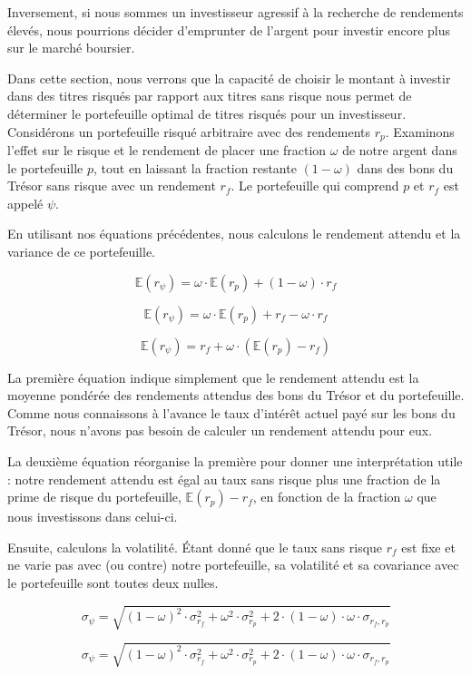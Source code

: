 \documentclass[a4paper, 12pt]{report}
\begin{document}
Inversement, si nous sommes un investisseur agressif à la recherche de rendements élevés, nous pourrions décider d'emprunter de l'argent pour investir encore plus sur le marché boursier.

Dans cette section, nous verrons que la capacité de choisir le montant à investir dans des titres risqués par rapport aux titres sans risque nous permet de déterminer le portefeuille optimal de titres risqués pour un investisseur.
Considérons un portefeuille risqué arbitraire avec des rendements \( r_p \). Examinons l'effet sur le risque et le rendement de placer une fraction \( \omega \) de notre argent dans le portefeuille \( p \), tout en laissant la fraction restante \( (1 - \omega) \) dans des bons du Trésor sans risque avec un rendement \( r_f \). Le portefeuille qui comprend \( p \) et \( r_f \) est appelé \( \psi \).

En utilisant nos équations précédentes, nous calculons le rendement attendu et la variance de ce portefeuille.

\[
\mathbb{E}(r_\psi) = \omega \cdot \mathbb{E}(r_p) + (1 - \omega) \cdot r_f 
\]

\[
\mathbb{E}(r_\psi) = \omega \cdot \mathbb{E}(r_p) + r_f - \omega \cdot r_f 
\]

\[
\mathbb{E}(r_\psi) = r_f + \omega \cdot (\mathbb{E}(r_p) - r_f) 
\]

La première équation indique simplement que le rendement attendu est la moyenne pondérée des rendements attendus des bons du Trésor et du portefeuille. Comme nous connaissons à l'avance le taux d'intérêt actuel payé sur les bons du Trésor, nous n'avons pas besoin de calculer un rendement attendu pour eux.

La deuxième équation réorganise la première pour donner une interprétation utile : notre rendement attendu est égal au taux sans risque plus une fraction de la prime de risque du portefeuille, \( \mathbb{E}(r_p) - r_f \), en fonction de la fraction \( \omega \) que nous investissons dans celui-ci.

Ensuite, calculons la volatilité. Étant donné que le taux sans risque \( r_f \) est fixe et ne varie pas avec (ou contre) notre portefeuille, sa volatilité et sa covariance avec le portefeuille sont toutes deux nulles.

\[
\sigma_\psi = \sqrt{(1 - \omega)^2 \cdot \sigma^2_{r_f} + \omega^2 \cdot \sigma^2_{r_p} + 2 \cdot (1 - \omega) \cdot \omega \cdot \sigma_{r_f, r_p}} 
\]

\[
\sigma_\psi = \sqrt{(1 - \omega)^2 \cdot \sigma^2_{r_f} + \omega^2 \cdot \sigma^2_{r_p} + 2 \cdot (1 - \omega) \cdot \omega \cdot \sigma_{r_f, r_p}} 
\]
\end{document}
